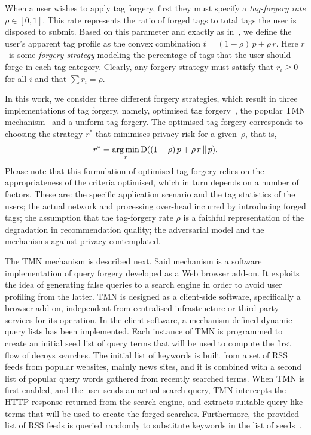 When a user wishes to apply tag forgery, first they must specify a \emph{tag-forgery rate} $\rho \in [0,1]$. This rate represents the ratio of forged tags to total tags the user is disposed to submit.
Based on this parameter and exactly as in~\cite{Rebollo10IT}, we define the user's apparent tag profile as the convex combination $t = (1 - \rho)\,p + \rho\,r $.
Here $r$~is some \emph{forgery strategy} modeling the percentage of tags that the user should forge in each tag category.
Clearly, any forgery strategy must satisfy that $r_i \geqslant 0$ for all $i$ and that $\sum r_i = \rho$.

In this work, we consider three different forgery strategies, which result in three implementations of tag forgery, namely, optimised tag forgery~\cite{Rebollo10IT}, the popular TMN mechanism~\cite{Howe06B} and a uniform tag forgery.
The optimised tag forgery corresponds to choosing the strategy $r^*$ that minimises privacy risk for a given~$\rho$, that is,
$$r^* = \operatorname*{arg\,min}_r \operatorname{D}((1 - \rho)\,p + \rho\,r\,\|\,\bar{p}).$$
Please note that this formulation of optimised tag forgery relies on the appropriateness of the criteria optimised, which in turn depends on a number of factors. These are: the specific application scenario and the tag statistics of the users; the actual network and processing over-head incurred by introducing forged tags; the assumption that the tag-forgery rate $\rho$ is a faithful representation of the degradation in recommendation quality; the adversarial model and the mechanisms against privacy contemplated.

The TMN mechanism is described next. Said mechanism is a software implementation of query forgery developed as a Web browser add-on. It exploits the idea of generating false queries to a search engine in order to avoid user profiling from the latter. TMN is designed as a client-side software, specifically a browser add-on, independent from centralised infrastructure or third-party services for its operation. In the client software, a mechanism defined dynamic query lists has been implemented. Each instance of TMN is programmed to create an initial seed list of query terms that will be used to compute the first flow of decoys searches. The initial list of keywords is built from a set of RSS feeds from popular websites, mainly news sites, and it is combined with a second list of popular query words gathered from recently searched terms. When TMN is first enabled, and the user sends an actual search query, TMN intercepts the HTTP response returned from the search engine, and extracts suitable query-like terms that will be used to create the forged searches. Furthermore, the provided list of RSS feeds is queried randomly to substitute keywords in the list of seeds~\cite{a24}.

